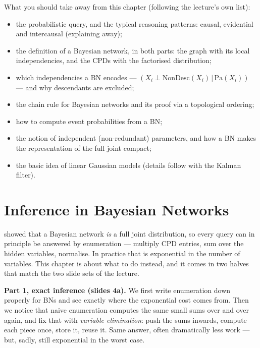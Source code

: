 \documentclass[11pt, oneside]{book}
\newcommand{\Prob}{\mathbb{P}}           %
\newcommand{\given}{\,\vert\,}           %
\newcommand{\Pa}{\mathrm{Pa}}            %
\newcommand{\NonDesc}{\mathrm{NonDesc}}  %
\newcommand{\indep}{\perp}               %
\begin{document}
What you should take away from this chapter (following the lecture's own
list):
\begin{itemize}
  \item the probabilistic query, and the typical reasoning patterns: causal,
    evidential and intercausal (explaining away);
  \item the definition of a Bayesian network, in both parts: the graph with
    its local independencies, and the CPDs with the factorised distribution;
  \item which independencies a BN encodes ---
    $(X_i \indep \NonDesc(X_i) \given \Pa(X_i))$ --- and why descendants are
    excluded;
  \item the chain rule for Bayesian networks and its proof via a topological
    ordering;
  \item how to compute event probabilities from a BN;
  \item the notion of independent (non-redundant) parameters, and how a BN
    makes the representation of the full joint compact;
  \item the basic idea of linear Gaussian models (details follow with the
    Kalman filter).
\end{itemize}


\chapter{Inference in Bayesian Networks}
\label{ch:inference}

 showed that a Bayesian network \emph{is} a full joint
distribution, so every query can in principle be answered by enumeration ---
multiply CPD entries, sum over the hidden variables, normalise. In practice
that is exponential in the number of variables. This chapter is about what to
do instead, and it comes in two halves that match the two slide sets of the
lecture.

\textbf{Part 1, exact inference (slides 4a).} We first write enumeration down
properly for BNs and see exactly where the exponential cost comes from. Then
we notice that naive enumeration computes the same small sums over and over
again, and fix that with \emph{variable elimination}: push the sums inwards,
compute each piece once, store it, reuse it. Same answer, often dramatically
less work --- but, sadly, still exponential in the worst case.
\end{document}
